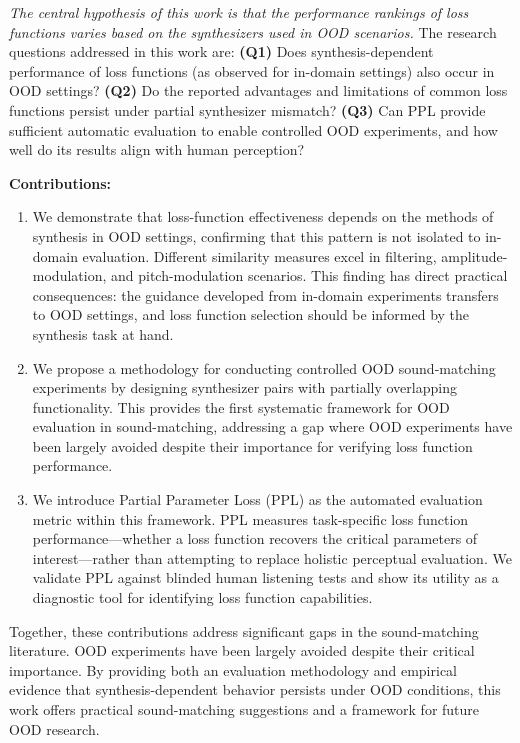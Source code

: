 \documentclass[10pt]{article} %
\begin{document}
 \textit{The central hypothesis of this work is that the performance rankings of loss functions varies based on the synthesizers used in OOD scenarios.} The research questions addressed in this work are: \textbf{(Q1)} Does synthesis-dependent performance of loss functions (as observed for in-domain settings) also occur in OOD settings? \textbf{(Q2)} Do the reported advantages and limitations of common loss functions persist under partial synthesizer mismatch? \textbf{(Q3)} Can PPL provide sufficient automatic evaluation to enable controlled OOD experiments, and how well do its results align with human perception?


\textbf{Contributions:} 
\begin{enumerate}
    \item We demonstrate that loss-function effectiveness depends on the methods of synthesis in OOD settings, confirming that this pattern is not isolated to in-domain evaluation. Different similarity measures excel in filtering, amplitude-modulation, and pitch-modulation scenarios. This finding has direct practical consequences: the guidance developed from in-domain experiments transfers to OOD settings, and loss function selection should be informed by the synthesis task at hand.

    \item  We propose a methodology for conducting controlled OOD sound-matching experiments by designing synthesizer pairs with partially overlapping functionality. This provides the first systematic framework for OOD evaluation in sound-matching, addressing a gap where OOD experiments have been largely avoided despite their importance for verifying loss function performance.
    
    \item We introduce Partial Parameter Loss (PPL) as the automated evaluation metric within this framework. PPL measures task-specific loss function performance---whether a loss function recovers the critical parameters of interest---rather than attempting to replace holistic perceptual evaluation. We validate PPL against blinded human listening tests and show its utility as a diagnostic tool for identifying loss function capabilities.
\end{enumerate}

Together, these contributions address significant gaps in the sound-matching literature. OOD experiments have been largely avoided despite their critical importance. By providing both an evaluation methodology and empirical evidence that synthesis-dependent behavior persists under OOD conditions, this work offers practical sound-matching suggestions and a framework for future OOD research.
\end{document}
